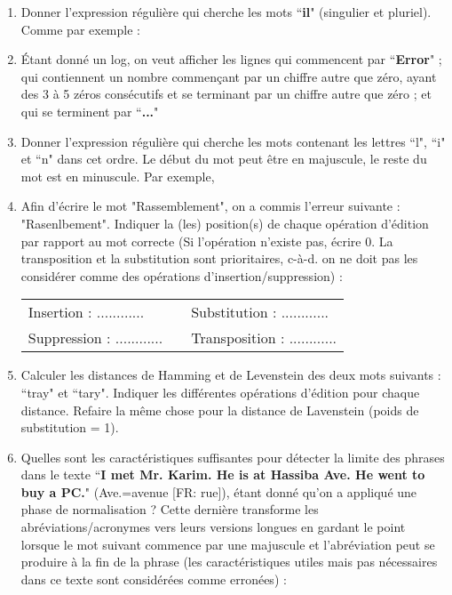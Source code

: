 \documentclass{KodeBook}
\begin{document}
\begin{enumerate}
	\item Donner l'expression régulière qui cherche les mots ``\textbf{il}" (singulier et pluriel). 
	Comme par exemple : 
	\item Étant donné un log, on veut afficher les lignes qui commencent par ``\textbf{Error}" ; qui contiennent un nombre commençant par un chiffre autre que zéro, ayant des 3 à 5 zéros consécutifs et se terminant par un chiffre autre que zéro ; et qui se terminent par ``\textbf{...}"
	\item Donner l'expression régulière qui cherche les mots contenant les lettres ``l", ``i" et ``n" dans cet ordre. Le début du mot peut être en majuscule, le reste du mot est en minuscule. Par exemple, 
	\item Afin d'écrire le mot "Rassemblement",  on a commis l'erreur suivante : "Rasenlbement". Indiquer la (les) position(s) de chaque opération d'édition par rapport au mot correcte (Si l'opération n'existe pas, écrire 0. La transposition et la substitution sont prioritaires, c-à-d. on ne doit pas les considérer comme des opérations d'insertion/suppression) :
	
	\begin{tabular}{|lll|}
		\hline 
		Insertion : ............ & & Substitution : ............ \\
		Suppression : ............ & & Transposition : ............ \\
		\hline
	\end{tabular}
	
	\item Calculer les distances de Hamming et de  Levenstein des deux mots suivants : ``tray" et ``tary".
	Indiquer les différentes opérations d'édition pour chaque distance. Refaire la même chose pour la distance de Lavenstein (poids de substitution = 1).
	
	\item Quelles sont les caractéristiques suffisantes pour détecter la limite des phrases dans le texte ``\textbf{I met Mr. Karim. He is at Hassiba Ave. He went to buy a PC.}" (Ave.=avenue [FR: rue]), étant donné qu'on a appliqué une phase de normalisation ? Cette dernière transforme les abréviations/acronymes vers leurs versions longues en gardant le point lorsque le mot suivant commence par une majuscule et l'abréviation peut se produire à la fin de la phrase (les caractéristiques utiles mais pas nécessaires dans ce texte sont considérées comme erronées) :
	

\end{enumerate}
\end{document}
